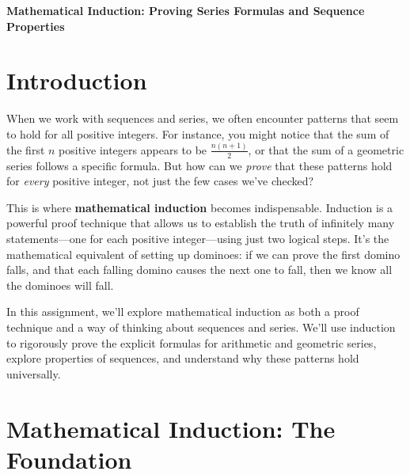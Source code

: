 \documentclass[12pt]{article}
\begin{document}
\begin{center}
\textbf{\Large Mathematical Induction: Proving Series Formulas and Sequence Properties} \\
\vspace{0.5cm}
\hspace{0.1\textwidth}
\end{center}

\vspace{0.5cm}

\section{Introduction}

When we work with sequences and series, we often encounter patterns that seem to hold for all positive integers. For instance, you might notice that the sum of the first $n$ positive integers appears to be $\frac{n(n+1)}{2}$, or that the sum of a geometric series follows a specific formula. But how can we \textit{prove} that these patterns hold for \textit{every} positive integer, not just the few cases we've checked?

This is where \textbf{mathematical induction} becomes indispensable. Induction is a powerful proof technique that allows us to establish the truth of infinitely many statements—one for each positive integer—using just two logical steps. It's the mathematical equivalent of setting up dominoes: if we can prove the first domino falls, and that each falling domino causes the next one to fall, then we know all the dominoes will fall.

In this assignment, we'll explore mathematical induction as both a proof technique and a way of thinking about sequences and series. We'll use induction to rigorously prove the explicit formulas for arithmetic and geometric series, explore properties of sequences, and understand why these patterns hold universally.

\section{Mathematical Induction: The Foundation}
\end{document}
